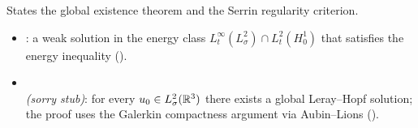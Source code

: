 \medskip\noindent
States the global existence theorem and the Serrin regularity criterion.

\begin{itemize}
  \item {}: a weak solution in the
    energy class $L^{\infty}_{t}(L^{2}_{\sigma}) \cap L^{2}_{t}(H^{1}_{0})$
    that satisfies the energy inequality ().
  \item {}\\
    \emph{(\textit{sorry} stub)}: for every $u_{0} \in L^{2}_{\sigma}(\mathbb{R}^{3})$
    there exists a global Leray--Hopf solution; the proof uses the Galerkin
    compactness argument via Aubin--Lions ().
\end{itemize}
